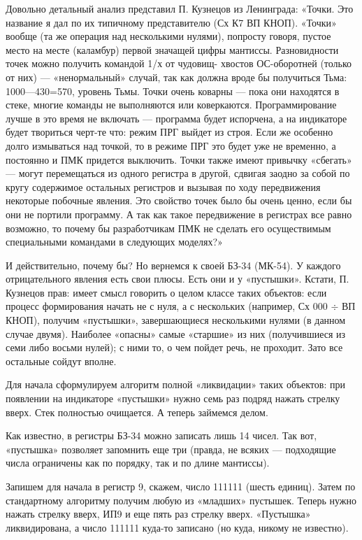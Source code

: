 \documentclass[11pt,a4paper,oneside]{article}
\begin{document}
Довольно детальный анализ представил П. Кузнецов из Ленинграда: «Точки. Это название я дал по их типичному представителю (Сх К7 ВП КНОП). «Точки» вообще (та же операция над несколькими нулями), попросту говоря, пустое место на месте (каламбур) первой значащей цифры мантиссы. Разновидности точек можно получить командой 1/х от чудовищ- хвостов ОС-оборотней (только от них) — «ненормальный» случай, так как должна вроде бы получиться Тьма: 1000—430=570, уровень Тьмы. Точки очень коварны — пока они находятся в стеке, многие команды не выполняются или коверкаются. Программирование лучше в это время не включать — программа будет испорчена, а на индикаторе будет твориться черт-те что: режим ПРГ выйдет из строя. Если же особенно долго измываться над точкой, то в режиме ПРГ это будет уже не временно, а постоянно и ПМК придется выключить. Точки также имеют привычку «сбегать» — могут перемещаться из одного регистра в другой, сдвигая заодно за собой по кругу содержимое остальных регистров и вызывая по ходу передвижения некоторые побочные явления. Это свойство точек было бы очень ценно, если бы они не портили программу. А так как такое передвижение в регистрах все равно возможно, то почему бы разработчикам ПМК не сделать его осуществимым специальными командами в следующих моделях?»

И действительно, почему бы? Но вернемся к своей БЗ-34 (МК-54). У каждого отрицательного явления есть свои плюсы. Есть они и у «пустышки». Кстати, П. Кузнецов прав: имеет смысл говорить о целом классе таких объектов: если процесс формирования начать не с нуля, а с нескольких (например, Сх 000 $\div$ ВП КНОП), получим «пустышки», завершающиеся несколькими нулями (в данном случае двумя). Наиболее «опасны» самые «старшие» из них (получившиеся из семи либо восьми нулей); с ними то, о чем пойдет речь, не проходит. Зато все остальные сойдут вполне.

Для начала сформулируем алгоритм полной «ликвидации» таких объектов: при появлении на индикаторе «пустышки» нужно семь раз подряд нажать стрелку вверх. Стек полностью очищается. А теперь займемся делом.

Как известно, в регистры БЗ-34 можно записать лишь 14 чисел. Так вот, «пустышка» позволяет запомнить еще три (правда, не всяких — подходящие числа ограничены как по порядку, так и по длине мантиссы).

Запишем для начала в регистр 9, скажем, число 111111 (шесть единиц). Затем по стандартному алгоритму получим любую из «младших» пустышек. Теперь нужно нажать стрелку вверх, ИП9 и еще пять раз стрелку вверх. «Пустышка» ликвидирована, а число 111111 куда-то записано (но куда, никому не известно).
\end{document}
